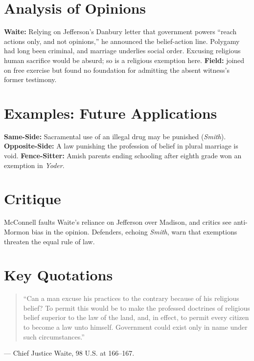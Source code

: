 \documentclass[12pt]{article}
\begin{document}
\section{Analysis of Opinions}
\textbf{Waite:} Relying on Jefferson's Danbury letter that government powers ``reach actions only, and not opinions,'' he announced the belief-action line. Polygamy had long been criminal, and marriage underlies social order. Excusing religious human sacrifice would be absurd; so is a religious exemption here. \textbf{Field:} joined on free exercise but found no foundation for admitting the absent witness's former testimony.

\section{Examples: Future Applications}
\textbf{Same-Side:} Sacramental use of an illegal drug may be punished (\textit{Smith}). \textbf{Opposite-Side:} A law punishing the profession of belief in plural marriage is void. \textbf{Fence-Sitter:} Amish parents ending schooling after eighth grade won an exemption in \textit{Yoder}.

\section{Critique}
McConnell faults Waite's reliance on Jefferson over Madison, and critics see anti-Mormon bias in the opinion. Defenders, echoing \textit{Smith}, warn that exemptions threaten the equal rule of law.

\section{Key Quotations}
\begin{quote}
``Can a man excuse his practices to the contrary because of his religious belief? To permit this would be to make the professed doctrines of religious belief superior to the law of the land, and, in effect, to permit every citizen to become a law unto himself. Government could exist only in name under such circumstances.''
\end{quote}
\noindent --- Chief Justice Waite, 98 U.S. at 166--167.
\end{document}
